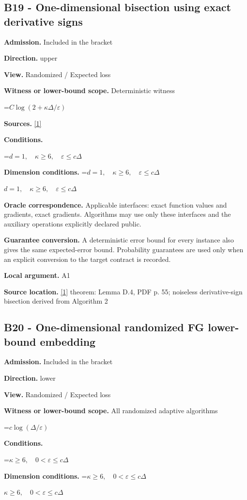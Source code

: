 \documentclass[10pt,a4paper]{article}
\newcommand{\AtlasMath}[1]{\par\begingroup\centering\setbox0=\hbox{$\displaystyle #1$}\ifdim\wd0>1.4\linewidth\typeout{ATLAS WIDE FORMULA: \the\wd0}\fi\ifdim\wd0>\linewidth\resizebox{\linewidth}{!}{\box0}\else\box0\fi\par\endgroup}
\newcommand{\AtlasInlineMath}[1]{\begingroup\setbox0=\hbox{$#1$}\ifdim\wd0>.4\linewidth\endgroup\AtlasMath{#1}\else\endgroup$#1$\fi}
\begin{document}
\subsection{B19 - One-dimensional bisection using exact derivative signs}
\textbf{Admission.} Included in the bracket

\textbf{Direction.} upper

\textbf{View.} Randomized / Expected loss

\textbf{Witness or lower-bound scope.} Deterministic witness

\AtlasMath{C\log(2+\kappa\Delta/\varepsilon)}
\textbf{Sources.} \href{https://arxiv.org/pdf/2609.03990}{[1]}

\textbf{Conditions.} 
\AtlasMath{d=1,\quad\kappa\ge6,\quad\varepsilon\le c\Delta}


\textbf{Dimension conditions.} \AtlasInlineMath{d=1,\quad\kappa\ge6,\quad\varepsilon\le c\Delta}

\textbf{Oracle correspondence.} Applicable interfaces: exact function values and gradients, exact gradients. Algorithms may use only these interfaces and the auxiliary operations explicitly declared public.

\textbf{Guarantee conversion.} A deterministic error bound for every instance also gives the same expected-error bound. Probability guarantees are used only when an explicit conversion to the target contract is recorded.

\textbf{Local argument.} A1

\textbf{Source location.} \href{https://arxiv.org/pdf/2609.03990}{[1]} theorem: Lemma D.4, PDF p. 55; noiseless derivative-sign bisection derived from Algorithm 2

\subsection{B20 - One-dimensional randomized FG lower-bound embedding}
\textbf{Admission.} Included in the bracket

\textbf{Direction.} lower

\textbf{View.} Randomized / Expected loss

\textbf{Witness or lower-bound scope.} All randomized adaptive algorithms

\AtlasMath{c\log(\Delta/\varepsilon)}
\textbf{Conditions.} 
\AtlasMath{\kappa\ge6,\quad0<\varepsilon\le c\Delta}


\textbf{Dimension conditions.} \AtlasInlineMath{\kappa\ge6,\quad0<\varepsilon\le c\Delta}
\end{document}
